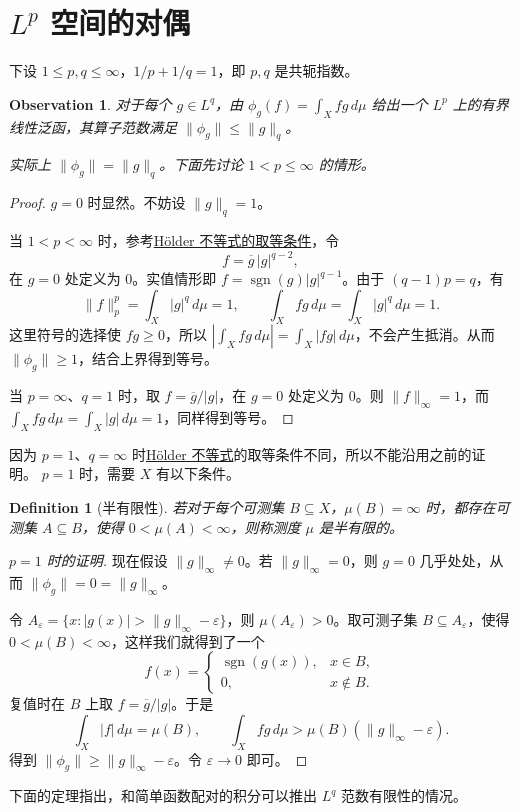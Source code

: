 \documentclass[12pt,letterpaper,twoside,openright]{ctexbook}
\theoremstyle{bluehead}
\theoremstyle{olivehead}
\newtheorem{definition}{Definition}
\theoremstyle{orangehead}
\theoremstyle{redremark}
\newtheorem*{observation}{Observation}
\begin{document}
\begin{center}
\setlength{\fboxsep}{12pt}
\end{center}

\section{\texorpdfstring{$L^p$}{Lp} 空间的对偶}
下设 $1\leq p,q\leq\infty$，$1/p+1/q=1$，即 $p,q$ 是共轭指数。

\begin{observation}
对于每个 $g\in L^q$，由 $\phi_g(f)=\int_Xfg\,d\mu$ 给出一个 $L^p$ 上的有界线性泛函，其算子范数满足 $\|\phi_g\|\leq\|g\|_q$。

实际上 $\|\phi_g\|=\|g\|_q$。下面先讨论 $1<p\leq\infty$ 的情形。
\end{observation}

\begin{proof}
$g=0$ 时显然。不妨设 $\|g\|_q=1$。

当 $1<p<\infty$ 时，参考\hyperref[thm:holder-lp]{Hölder 不等式的取等条件}，令
\[
f=\overline g\,|g|^{q-2},
\]
在 $g=0$ 处定义为 $0$。实值情形即 $f=\operatorname{sgn}(g)|g|^{q-1}$。由于 $(q-1)p=q$，有
\[
\|f\|_p^p=\int_X|g|^q\,d\mu=1,
\qquad
\int_Xfg\,d\mu=\int_X|g|^q\,d\mu=1.
\]
这里符号的选择使 $fg\geq0$，所以 $|\int_Xfg\,d\mu|=\int_X|fg|\,d\mu$，不会产生抵消。从而 $\|\phi_g\|\geq1$，结合上界得到等号。

当 $p=\infty$、$q=1$ 时，取 $f=\overline g/|g|$，在 $g=0$ 处定义为 $0$。则 $\|f\|_\infty=1$，而 $\int_Xfg\,d\mu=\int_X|g|\,d\mu=1$，同样得到等号。
\end{proof}

因为 $p=1$、$q=\infty$ 时\hyperref[thm:holder-lp]{Hölder 不等式}的取等条件不同，所以不能沿用之前的证明。
$p=1$ 时，需要 $X$ 有以下条件。

\begin{definition}[半有限性]
若对于每个可测集 $B\subseteq X$，$\mu(B)=\infty$ 时，都存在可测集 $A\subseteq B$，使得 $0<\mu(A)<\infty$，则称测度 $\mu$ 是半有限的。
\end{definition}

\begin{proof}[$p=1$ 时的证明]
现在假设 $\|g\|_\infty\ne0$。若 $\|g\|_\infty=0$，则 $g=0$ 几乎处处，从而 $\|\phi_g\|=0=\|g\|_\infty$。

令 $A_\varepsilon=\{x:|g(x)|>\|g\|_\infty-\varepsilon\}$，则 $\mu(A_\varepsilon)>0$。取可测子集 $B\subseteq A_\varepsilon$，使得 $0<\mu(B)<\infty$，这样我们就得到了一个
\[
f(x)=
\begin{cases}
\operatorname{sgn}(g(x)),&x\in B,\\
0,&x\notin B.
\end{cases}
\]
复值时在 $B$ 上取 $f=\overline g/|g|$。于是
\[
\int_X|f|\,d\mu=\mu(B),\qquad
\int_Xfg\,d\mu>\mu(B)(\|g\|_\infty-\varepsilon).
\]
得到 $\|\phi_g\|\geq\|g\|_\infty-\varepsilon$。令 $\varepsilon\to0$ 即可。
\end{proof}
下面的定理指出，和简单函数配对的积分可以推出 $L^q$ 范数有限性的情况。
\end{document}
